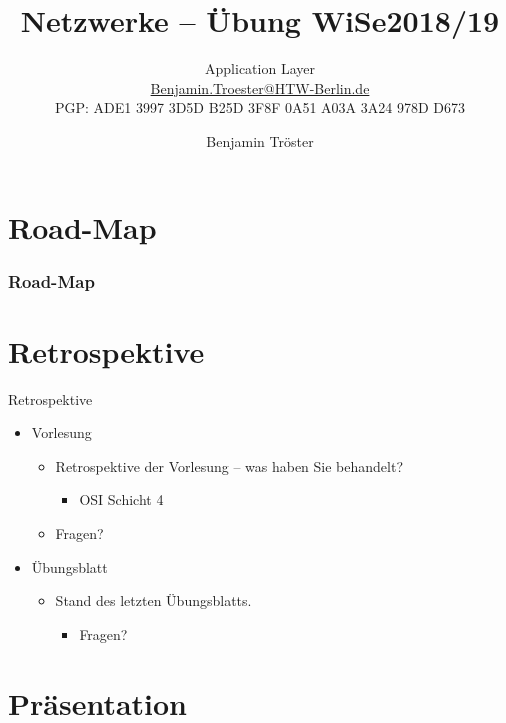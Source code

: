 \documentclass[xcolor=dvipsnames, aspectratio=169]{beamer}
\begin{document}

\title{Netzwerke -- Übung WiSe2018/19}
\subtitle{Application Layer\\
		\href{mailto:Benjamin.Troester@HTW-Berlin.de}{Benjamin.Troester@HTW-Berlin.de}\\
		PGP: ADE1 3997 3D5D B25D 3F8F 0A51 A03A 3A24 978D D673 }
\author{Benjamin Tröster}

\date{}

\begin{frame}
\titlepage

\end{frame}

\section*{Road-Map}
\begin{frame}
\frametitle{Road-Map}
\begin{multicols}{2}
  \tableofcontents
\end{multicols}
\end{frame}

\section{Retrospektive}
\begin{frame}{Retrospektive}
\begin{itemize}[<+->]
	\item Vorlesung
	\begin{itemize}
		\item Retrospektive der Vorlesung -- was haben Sie behandelt?
		\begin{itemize}[<+->]
			\item OSI Schicht 4
		\end{itemize}
		\item Fragen?
	\end{itemize}
	\item Übungsblatt
	\begin{itemize}
		\item Stand des letzten Übungsblatts.
		\begin{itemize}
			\item Fragen?
		\end{itemize}
	\end{itemize}
\end{itemize}
\end{frame}


\section{Präsentation}
\end{document}
